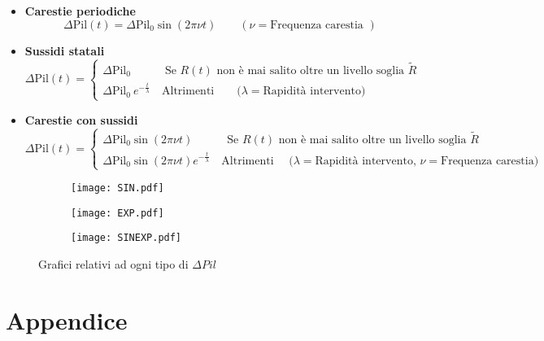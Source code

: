 \begin{itemize}
	\item \textbf{Carestie periodiche}\\
\begin{equation}
	\Delta\text{Pil}(t)=\Delta\text{Pil}_0\sin(2\pi\nu t) \qquad (\nu=\text{Frequenza carestia })
\end{equation}
\item \textbf{Sussidi statali}\\
\begin{equation}
	\Delta\text{Pil}(t)=
	\begin{cases}
		\Delta\text{Pil}_0 \qquad \quad \text{Se $R(t)$ non è mai salito oltre un livello soglia $\tilde{R}$}\\
		\Delta\text{Pil}_0\ e^{-\frac{t}{\lambda}} \quad \text{Altrimenti}\qquad     \text{($\lambda=$Rapidità intervento)}
	\end{cases}
\end{equation}
\item \textbf{Carestie con sussidi}
\begin{equation}
	\Delta\text{Pil}(t)=
	\begin{cases}
		\Delta\text{Pil}_0\sin(2\pi\nu t) \qquad \quad \text{Se $R(t)$ non è mai salito oltre un livello soglia $\tilde{R}$}\\
		\Delta\text{Pil}_0\sin(2\pi\nu t)e^{-\frac{t}{\lambda}} \quad \text{Altrimenti}\quad     \text{ ($\lambda=$Rapidità intervento, $\nu=$Frequenza carestia)}
	\end{cases}
\end{equation}
\end{itemize}
\begin{figure}[H]
	\centering
	\begin{subfigure}[H]{0.6\textwidth}
		\centering
		\texttt{[image: SIN.pdf]}
	\end{subfigure}
	\hfill
	\begin{subfigure}[H]{0.6\textwidth}
		\centering
		\texttt{[image: EXP.pdf]}
	\end{subfigure}
	\hfill
	\begin{subfigure}[H]{0.6\textwidth}
		\centering
		\texttt{[image: SINEXP.pdf]}
	\end{subfigure}
	\caption{Grafici relativi ad ogni tipo di $ \Delta Pil$}
\end{figure}
\newpage
\appendix
\section*{Appendice}

